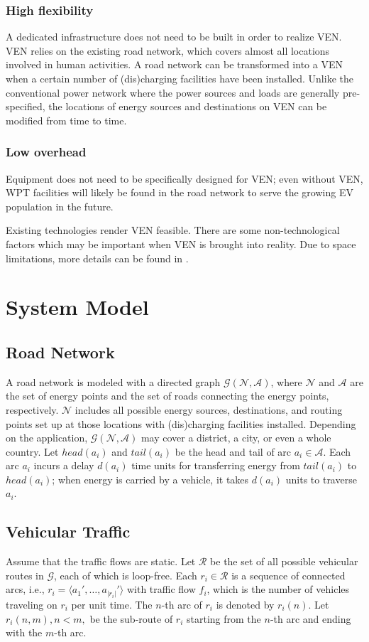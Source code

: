 \documentclass[journal]{IEEEtran}
\begin{document}
\subsubsection{High flexibility}
A dedicated infrastructure does not need to be built in order to realize VEN. VEN relies on the existing road network, which covers  almost all locations involved in human activities. A road network can be transformed into a VEN when a certain number of (dis)charging facilities  have been installed. Unlike the conventional power network where the power sources and loads are generally pre-specified, the locations of  energy sources and destinations on VEN can be modified from time to time.
\subsubsection{Low overhead}
Equipment does not need to be specifically designed for VEN; even without VEN, WPT facilities will likely be found in the road network to serve the growing EV population in the future.


Existing technologies render VEN feasible. There are some non-technological factors which may be important when VEN is brought into reality. Due to space limitations, more details can be found in \cite{VEN_conf}.



\section{System Model} \label{sec:model}
\subsection{Road Network}
A road network is modeled with a directed graph $\mathcal{G}(\mathcal{N},\mathcal{A})$, where $\mathcal{N}$ and $\mathcal{A}$ are the set of energy points and the set of roads connecting the energy points, respectively. $\mathcal{N}$ includes all possible energy sources, destinations, and routing points set up at those locations with (dis)charging facilities installed. Depending on the application, $\mathcal{G}(\mathcal{N},\mathcal{A})$ may cover a district, a city, or even a whole country. Let $head(a_i)$ and $tail(a_i)$ be the head and tail of arc $a_i\in \mathcal{A}$. Each arc $a_i$ incurs a delay $d(a_i)$ time units for transferring energy from $tail(a_i)$ to $head(a_i)$; when energy is carried by a vehicle, it takes $d(a_i)$ units to traverse $a_i$. 

\subsection{Vehicular Traffic}
Assume that the traffic flows are static. Let $\mathcal{R}$ be the set of all possible vehicular routes in $\mathcal{G}$, each of which is loop-free. Each $r_i\in\mathcal{R}$ is a sequence of connected arcs, i.e., $r_i = \langle a_1',\ldots,a_{|r_i|}' \rangle$ with traffic flow $f_i$, which is the number of vehicles traveling on $r_i$ per unit time. The $n$-th arc of $r_i$ is denoted by $r_i(n)$. Let $r_i(n,m), n<m,$ be the sub-route of $r_i$ starting from the $n$-th arc and ending with the $m$-th arc. 
\end{document}
